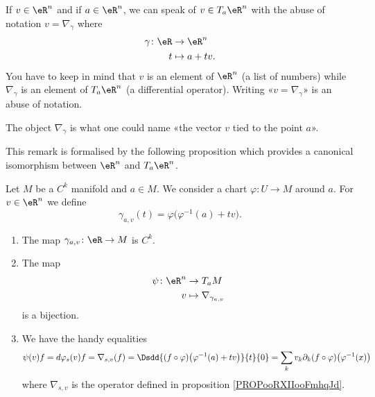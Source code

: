 \begin{normaltext}      \label{NORMooXAJGooDNyxjv}
    If \( v\in \eR^n\) and if \( a\in \eR^n\), we can speak of \( v\in T_a\eR^n\) with the abuse of notation \( v=\nabla_{\gamma}\) where
    \begin{equation}
        \begin{aligned}
            \gamma\colon \eR&\to \eR^n \\
            t&\mapsto a+tv.
        \end{aligned}
    \end{equation}
    You have to keep in mind that \( v\) is an element of \( \eR^n\) (a list of numbers) while \( \nabla_{\gamma}\) is an element of \( T_a\eR^n\) (a differential operator). Writing «\( v=\nabla_{\gamma}\)» is an abuse of notation.

    The object \( \nabla_{\gamma}\) is what one could name «the vector \( v\) tied to the point \( a\)».
\end{normaltext}

This remark is formalised by the following proposition which provides a canonical isomorphism between \( \eR^n\) and \( T_a\eR^n\).

\begin{proposition}     \label{PROPooRXIIooFmhqJd}
    Let \( M\) be a \( C^k\) manifold and \( a\in M\). We consider a chart \( \varphi\colon U\to M\) around \( a\). For \( v\in \eR^n\) we define
    \begin{equation}
        \gamma_{a,v}(t)=\varphi\big( \varphi^{-1}(a)+tv \big).
    \end{equation}
    \begin{enumerate}
        \item
            The map \( \gamma_{a,v}\colon \eR\to M\) is \( C^k\).
        \item
            The map
            \begin{equation}
                \begin{aligned}
                    \psi\colon \eR^n&\to T_aM \\
                    v&\mapsto \nabla_{\gamma_{a,v}} 
                \end{aligned}
            \end{equation}
            is a bijection.
        \item
            We have the handy equalities
            \begin{equation}
                \psi(v)f=d\varphi_s(v)f=\nabla_{s,v}(f)=\Dsdd{ (f\circ\varphi)\big( \varphi^{-1}(a)+tv \big) }{t}{0}=\sum_kv_k\partial_k(f\circ\varphi)\big( \varphi^{-1}(x) \big)
            \end{equation}
            where \( \nabla_{s,v}\) is the operator defined in proposition \ref{PROPooRXIIooFmhqJd}.
    \end{enumerate}
\end{proposition}

